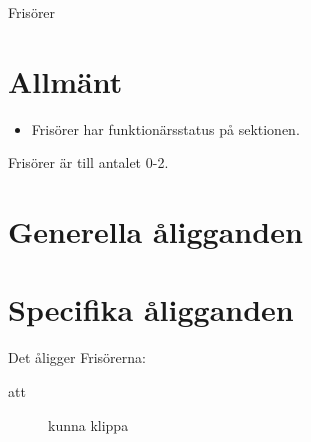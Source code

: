 \documentclass[a4paper]{article}
\begin{document}
\renewcommand{\forening}{Frisörer} %

\begin{foreningenv}{\forening{}} %

    \section{Allmänt}
    \begin{itemize}
        \item Frisörer har funktionärsstatus på sektionen.
    \end{itemize}
    Frisörer är till antalet 0-2.
    
    \section{Generella åligganden}
    \aliggsektfunkt{}
    
    \section{Specifika åligganden}
    Det åligger \forening{}na:
    \begin{description}
        \item[att] kunna klippa
    \end{description}
\end{foreningenv}
\end{document}
